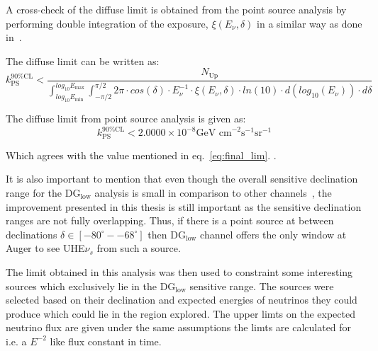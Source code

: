 A cross-check of the diffuse limit is obtained from the point source analysis by performing double integration of the exposure, $\xi(E_{\nu}, \delta)$ in a similar way as done in~\cite{gap_note_2013}.

The diffuse limit can be written as:
\begin{equation}
  k_{\text{PS}}^{90\% \text{CL}} < \frac{N_{\text{Up}}}{\int_{log_{10}E_{\text{min}}}^{log_{10}E_{\text{max}}} \int_{-\pi/2}^{\pi/2}2\pi \cdot cos(\delta) \cdot E_{\nu}^{-1} \cdot \xi(E_{\nu}, \delta) \cdot ln(10) \cdot d(log_{10}(E_{\nu})) \cdot d\delta}
\end{equation}

The diffuse limit from point source analysis is given as: 
\begin{equation}
  k_{\text{PS}}^{90\%\text{CL}} < 2.0000 \times 10^{-8} \text{GeV cm}^{-2} \text{s}^{-1} \text{sr}^{-1}
\end{equation}

Which agrees with the value mentioned in eq.~\ref{eq:final_lim}. . 

It is also important to mention that even though the overall sensitive declination range for the DG$_{\text{low}}$ analysis is small in comparison to other channels~\cite{Aab_2019_point}, the improvement presented in this thesis is still important as the sensitive declination ranges are not fully overlapping. Thus, if there is a point source at between declinations $ \delta \in [-80^{\circ}- -68^{\circ}]$ then DG$_{\text{low}}$ channel offers the only window at Auger to see UHE$\nu_s$ from such a source.  


The limit obtained in this analysis was then used to constraint some interesting sources which exclusively lie in the DG$_{\text{low}}$ sensitive range. The sources were selected based on their declination and expected energies of neutrinos they could produce which could lie in the region explored. The upper limts on the expected neutrino flux are given under the same assumptions the limts are calculated for i.e. a $E^{-2}$ like flux constant in time. 

